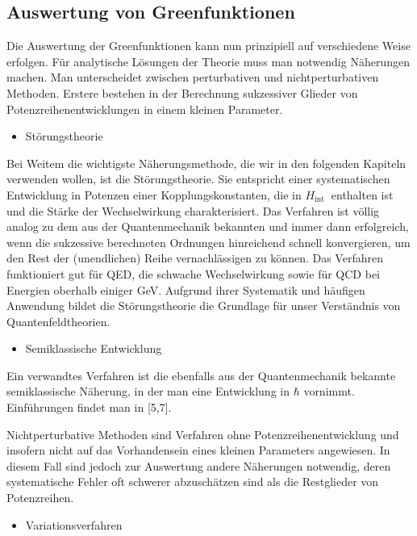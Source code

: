\documentclass[10pt, letterpaper]{article}
\begin{document}
\subsection*{Auswertung von Greenfunktionen}
Die Auswertung der Greenfunktionen kann nun prinzipiell auf verschiedene Weise erfolgen. Für analytische Lösungen der Theorie muss man notwendig Näherungen machen. Man unterscheidet zwischen perturbativen und nichtperturbativen Methoden. Erstere bestehen in der Berechnung sukzessiver Glieder von Potenzreihenentwicklungen in einem kleinen Parameter.

\begin{itemize}
  \item Störungstheorie
\end{itemize}

Bei Weitem die wichtigste Näherungsmethode, die wir in den folgenden Kapiteln verwenden wollen, ist die Störungstheorie. Sie entspricht einer systematischen Entwicklung in Potenzen einer Kopplungskonstanten, die in $H_{\text {int }}$ enthalten ist und die Stärke der Wechselwirkung charakterisiert. Das Verfahren ist völlig analog zu dem aus der Quantenmechanik bekannten und immer dann erfolgreich, wenn die sukzessive berechneten Ordnungen hinreichend schnell konvergieren, um den Rest der (unendlichen) Reihe vernachlässigen zu können. Das Verfahren funktioniert gut für QED, die schwache Wechselwirkung sowie für QCD bei Energien oberhalb einiger GeV. Aufgrund ihrer Systematik und häufigen Anwendung bildet die Störungstheorie die Grundlage für unser Verständnis von Quantenfeldtheorien.

\begin{itemize}
  \item Semiklassische Entwicklung
\end{itemize}

Ein verwandtes Verfahren ist die ebenfalls aus der Quantenmechanik bekannte semiklassische Näherung, in der man eine Entwicklung in $\hbar$ vornimmt. Einführungen findet man in [5,7].

Nichtperturbative Methoden sind Verfahren ohne Potenzreihenentwicklung und insofern nicht auf das Vorhandensein eines kleinen Parameters angewiesen. In diesem Fall sind jedoch zur Auswertung andere Näherungen notwendig, deren systematische Fehler oft schwerer abzuschätzen sind als die Restglieder von Potenzreihen.

\begin{itemize}
  \item Variationsverfahren
\end{itemize}
\end{document}
